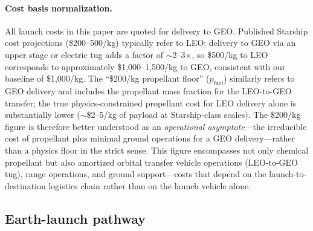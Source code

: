 \documentclass[preprint,12pt]{elsarticle}
\begin{document}
\paragraph{Cost basis normalization.} All launch costs in this paper are quoted for delivery to GEO. Published Starship cost projections (\$200--500/kg) typically refer to LEO; delivery to GEO via an upper stage or electric tug adds a factor of $\sim$2--3$\times$, so \$500/kg to LEO corresponds to approximately \$1,000--1,500/kg to GEO, consistent with our baseline of \$1,000/kg. The ``\$200/kg propellant floor'' ($p_{\mathrm{fuel}}$) similarly refers to GEO delivery and includes the propellant mass fraction for the LEO-to-GEO transfer; the true physics-constrained propellant cost for LEO delivery alone is substantially lower ($\sim$\$2--5/kg of payload at Starship-class scales). The \$200/kg figure is therefore better understood as an \emph{operational asymptote}---the irreducible cost of propellant plus minimal ground operations for a GEO delivery---rather than a physics floor in the strict sense. This figure encompasses not only chemical propellant but also amortized orbital transfer vehicle operations (LEO-to-GEO tug), range operations, and ground support---costs that depend on the launch-to-destination logistics chain rather than on the launch vehicle alone.

\subsection{Earth-launch pathway}
\end{document}
